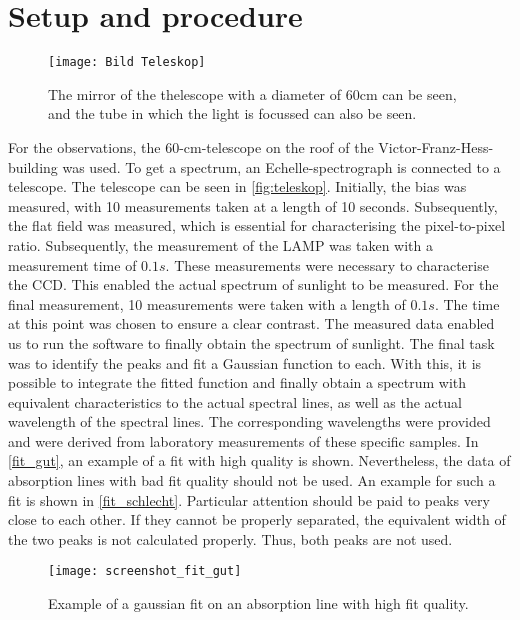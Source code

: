 \section{Setup and procedure}
\begin{figure}[H]
	\centering
	\texttt{[image: Bild Teleskop]}
	\caption{The mirror of the thelescope with a diameter of 60cm can be seen, and the tube in which the light is focussed can also be seen.}
	\label{fig:teleskop}
\end{figure}


For the observations, the 60-cm-telescope on the roof of the Victor-Franz-Hess-building was used. To get a spectrum, an Echelle-spectrograph is connected to a telescope. The telescope can be seen in \autoref{fig:teleskop}.
Initially, the bias was measured, with 10 measurements taken at a length of 10 seconds. Subsequently, the flat field was measured, which is essential for characterising the pixel-to-pixel ratio. Subsequently, the measurement of the LAMP was taken with a measurement time of $0.1 \unit{s}$. These measurements were necessary to characterise the CCD. This enabled the actual spectrum of sunlight to be measured. For the final measurement, 10 measurements were taken with a length of $0.1\unit{ s}$. The time at this point was chosen to ensure a clear contrast.
The measured data enabled us to run the software to finally obtain the spectrum of sunlight. The final task was to identify the peaks and fit a Gaussian function to each. With this, it is possible to integrate the fitted function and finally obtain a spectrum with equivalent characteristics to the actual spectral lines, as well as the actual wavelength of the spectral lines. The corresponding wavelengths were provided and were derived from laboratory measurements of these specific samples. In \autoref{fit_gut}, an example of a fit with high quality is shown. Nevertheless, the data of absorption lines with bad fit quality should not be used. An example for such a fit is shown in \autoref{fit_schlecht}. Particular attention should be paid to peaks very close to each other. If they cannot be properly separated, the equivalent width of the two peaks is not calculated properly. Thus, both peaks are not used. 
\begin{figure}[H]
	\centering
	\texttt{[image: screenshot\_fit\_gut]}
	\caption{Example of a gaussian fit on an absorption line with high fit quality.}
	\label{fit_gut}
\end{figure}



